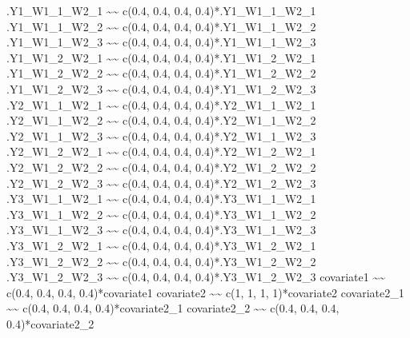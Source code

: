 \documentclass[
]{book}
\newenvironment{Shaded}{\begin{snugshade}}{\end{snugshade}}
\newcommand{\StringTok}[1]{\textcolor[rgb]{0.31,0.60,0.02}{#1}}
\begin{document}
\begin{Shaded}
\begin{Highlighting}[]
\StringTok{.Y1\_W1\_1\_W2\_1 \textasciitilde{}\textasciitilde{}}
\StringTok{    c(0.4, 0.4, 0.4, 0.4)*.Y1\_W1\_1\_W2\_1}
\StringTok{.Y1\_W1\_1\_W2\_2 \textasciitilde{}\textasciitilde{}}
\StringTok{    c(0.4, 0.4, 0.4, 0.4)*.Y1\_W1\_1\_W2\_2}
\StringTok{.Y1\_W1\_1\_W2\_3 \textasciitilde{}\textasciitilde{}}
\StringTok{    c(0.4, 0.4, 0.4, 0.4)*.Y1\_W1\_1\_W2\_3}
\StringTok{.Y1\_W1\_2\_W2\_1 \textasciitilde{}\textasciitilde{}}
\StringTok{    c(0.4, 0.4, 0.4, 0.4)*.Y1\_W1\_2\_W2\_1}
\StringTok{.Y1\_W1\_2\_W2\_2 \textasciitilde{}\textasciitilde{}}
\StringTok{    c(0.4, 0.4, 0.4, 0.4)*.Y1\_W1\_2\_W2\_2}
\StringTok{.Y1\_W1\_2\_W2\_3 \textasciitilde{}\textasciitilde{}}
\StringTok{    c(0.4, 0.4, 0.4, 0.4)*.Y1\_W1\_2\_W2\_3}
\StringTok{.Y2\_W1\_1\_W2\_1 \textasciitilde{}\textasciitilde{}}
\StringTok{    c(0.4, 0.4, 0.4, 0.4)*.Y2\_W1\_1\_W2\_1}
\StringTok{.Y2\_W1\_1\_W2\_2 \textasciitilde{}\textasciitilde{}}
\StringTok{    c(0.4, 0.4, 0.4, 0.4)*.Y2\_W1\_1\_W2\_2}
\StringTok{.Y2\_W1\_1\_W2\_3 \textasciitilde{}\textasciitilde{}}
\StringTok{    c(0.4, 0.4, 0.4, 0.4)*.Y2\_W1\_1\_W2\_3}
\StringTok{.Y2\_W1\_2\_W2\_1 \textasciitilde{}\textasciitilde{}}
\StringTok{    c(0.4, 0.4, 0.4, 0.4)*.Y2\_W1\_2\_W2\_1}
\StringTok{.Y2\_W1\_2\_W2\_2 \textasciitilde{}\textasciitilde{}}
\StringTok{    c(0.4, 0.4, 0.4, 0.4)*.Y2\_W1\_2\_W2\_2}
\StringTok{.Y2\_W1\_2\_W2\_3 \textasciitilde{}\textasciitilde{}}
\StringTok{    c(0.4, 0.4, 0.4, 0.4)*.Y2\_W1\_2\_W2\_3}
\StringTok{.Y3\_W1\_1\_W2\_1 \textasciitilde{}\textasciitilde{}}
\StringTok{    c(0.4, 0.4, 0.4, 0.4)*.Y3\_W1\_1\_W2\_1}
\StringTok{.Y3\_W1\_1\_W2\_2 \textasciitilde{}\textasciitilde{}}
\StringTok{    c(0.4, 0.4, 0.4, 0.4)*.Y3\_W1\_1\_W2\_2}
\StringTok{.Y3\_W1\_1\_W2\_3 \textasciitilde{}\textasciitilde{}}
\StringTok{    c(0.4, 0.4, 0.4, 0.4)*.Y3\_W1\_1\_W2\_3}
\StringTok{.Y3\_W1\_2\_W2\_1 \textasciitilde{}\textasciitilde{}}
\StringTok{    c(0.4, 0.4, 0.4, 0.4)*.Y3\_W1\_2\_W2\_1}
\StringTok{.Y3\_W1\_2\_W2\_2 \textasciitilde{}\textasciitilde{}}
\StringTok{    c(0.4, 0.4, 0.4, 0.4)*.Y3\_W1\_2\_W2\_2}
\StringTok{.Y3\_W1\_2\_W2\_3 \textasciitilde{}\textasciitilde{}}
\StringTok{    c(0.4, 0.4, 0.4, 0.4)*.Y3\_W1\_2\_W2\_3}
\StringTok{covariate1 \textasciitilde{}\textasciitilde{}}
\StringTok{    c(0.4, 0.4, 0.4, 0.4)*covariate1}
\StringTok{covariate2 \textasciitilde{}\textasciitilde{}}
\StringTok{    c(1, 1, 1, 1)*covariate2}
\StringTok{covariate2\_1 \textasciitilde{}\textasciitilde{}}
\StringTok{    c(0.4, 0.4, 0.4, 0.4)*covariate2\_1}
\StringTok{covariate2\_2 \textasciitilde{}\textasciitilde{}}
\StringTok{    c(0.4, 0.4, 0.4, 0.4)*covariate2\_2}

\end{Highlighting}
\end{Shaded}
\end{document}
